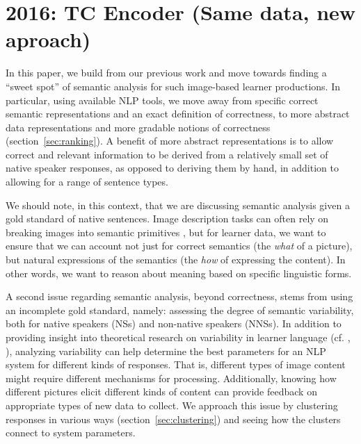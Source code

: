 

\section{2016: TC Encoder (Same data, new aproach)}
In this paper, we build from our previous work \citep{king:dickinson:13, king:dickinson:14} and move towards finding a ``sweet spot'' of
semantic analysis \citep[cf.][]{bailey:meurers:08} for such
image-based learner productions.
In particular, using available NLP tools,
we move away from specific correct semantic representations and an
exact definition of correctness, to more abstract data representations
and more gradable notions of correctness (section~\ref{sec:ranking}).
A benefit of more abstract representations is to allow correct
and relevant information to be derived from a relatively small set of
native speaker responses, as opposed to deriving them by hand, in
addition to allowing for a range of sentence types.

We should note, in this context, that we are discussing semantic
analysis given a gold standard of native sentences.  Image description
tasks can often rely on breaking images into semantic primitives
\citep[see, e.g.,][and references therein]{ortiz:wolff:lapata:15}, but
for learner data, we want to ensure that we can account not just for
correct semantics (the \emph{what} of a picture), but natural
expressions of the semantics (the \emph{how} of expressing the
content).  In other words, we want to reason about meaning based on
specific linguistic forms.

A second issue regarding semantic analysis, beyond correctness, stems
from using an incomplete gold standard, namely: assessing the degree
of semantic variability, both for native speakers (NSs) and non-native
speakers (NNSs).
In addition to providing insight into
theoretical research on variability 
in learner language (cf. \citet{ellis1987variability}, \citet{kanno1998consistency}), analyzing variability can help determine
the best parameters for an NLP system for different kinds of
responses.  That is, different types of image content might require
different mechanisms for processing.  Additionally, knowing how
different pictures elicit different kinds of content can provide
feedback on appropriate types of new data to collect.
We approach this issue by clustering responses in various ways
(section~\ref{sec:clustering}) and seeing how the clusters connect to
system parameters.

